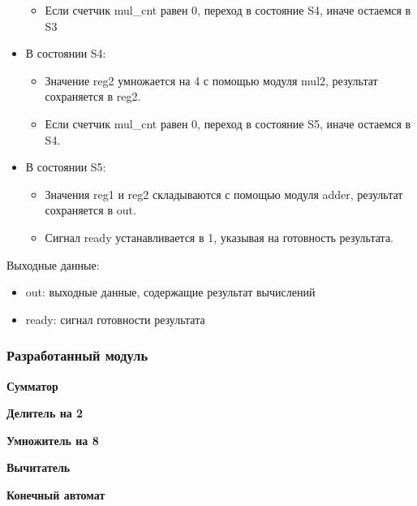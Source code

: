 \documentclass[12pt,onecolumn]{article}
\begin{document}
\begin{itemize}
{\begin{itemize}
            \item Если счетчик mul\_cnt равен 0, переход в состояние S4, иначе остаемся в S3
        \end{itemize}
    }
    \item {
        В состоянии S4:
        \begin{itemize}
            \item Значение reg2 умножается на 4 с помощью модуля mul2, результат сохраняется в reg2.
            \item Если счетчик mul\_cnt равен 0, переход в состояние S5, иначе остаемся в S4.
        \end{itemize}
    }
    \item {
        В состоянии S5:
        \begin{itemize}
            \item Значения reg1 и reg2 складываются с помощью модуля adder, результат сохраняется в out.
            \item Сигнал ready устанавливается в 1, указывая на готовность результата.
        \end{itemize}
    }
\end{itemize}

Выходные данные:
\begin{itemize}
    \item out: выходные данные, содержащие результат вычислений
    \item ready: сигнал готовности результата
\end{itemize}

\subsubsection{Разработанный модуль}
\textbf{Сумматор}

\textbf{Делитель на 2}

\textbf{Умножитель на 8}

\textbf{Вычитатель}

\textbf{Конечный автомат}

\end{document}
